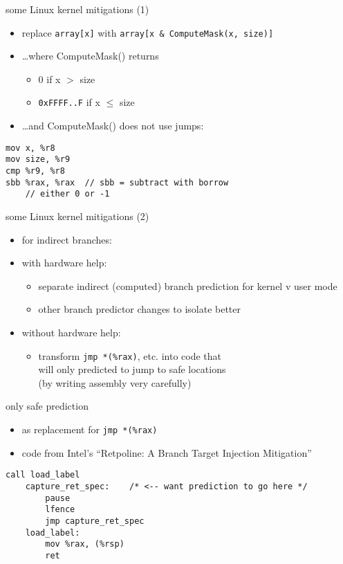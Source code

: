 \begin{frame}[fragile]{some Linux kernel mitigations (1)}
\begin{itemize}
\item replace \lstinline|array[x]| with \lstinline|array[x & ComputeMask(x, size)]|
\item \ldots where ComputeMask() returns
    \begin{itemize}
    \item 0 if x $>$ size
    \item \texttt{0xFFFF..F} if x $\le$ size
    \end{itemize}
\item \ldots and ComputeMask() does not use jumps:
\end{itemize}
\begin{lstlisting}[style=small,language=myasm]
mov x, %r8
mov size, %r9
cmp %r9, %r8
sbb %rax, %rax  // sbb = subtract with borrow
    // either 0 or -1
\end{lstlisting}
\end{frame}

\begin{frame}[fragile]{some Linux kernel mitigations (2)}
\begin{itemize}
\item for indirect branches:
\vspace{.5cm}
\item with hardware help:
    \begin{itemize}
    \item separate indirect (computed) branch prediction for kernel v user mode
    \item other branch predictor changes to isolate better
    \end{itemize}
\item without hardware help:
    \begin{itemize}
    \item transform \lstinline|jmp *(%rax)|, etc. into code that \\
        will only predicted to jump to safe locations \\
        (by writing assembly very carefully)
    \end{itemize}
\end{itemize}
\end{frame}

\begin{frame}[fragile]{only safe prediction}
\begin{itemize}
\item as replacement for \lstinline|jmp *(%rax)|
\item code from Intel's ``Retpoline: A Branch Target Injection Mitigation''
\end{itemize}
\begin{lstlisting}[language=myasm,style=small]
        call load_label
    capture_ret_spec:    /* <-- want prediction to go here */
        pause
        lfence
        jmp capture_ret_spec
    load_label:
        mov %rax, (%rsp)
        ret
\end{lstlisting}
\end{frame}
